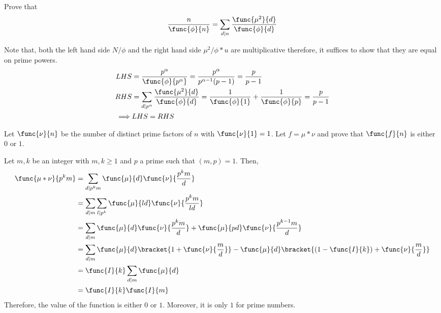 \begin{exercise}
    \item Prove that
    \begin{equation*}
        \frac{n}{\func{\phi}{n}} = \sum_{d \mid n} \dfrac{\func{\mu^2}{d}}{\func{\phi}{d}}
    \end{equation*}
    \begin{solution}
        Note that, both the left hand side \(N/\phi\) and the right hand side \(\mu^2/\phi \ast u\) are multiplicative therefore, it suffices to show that they are equal on prime powers.
        \begin{align*}
            LHS &= \dfrac{p^{\alpha}}{\func{\phi}{p^{\alpha}}} = \dfrac{p^{\alpha}}{p^{\alpha - 1}(p - 1)} = \dfrac{p}{p-1} \\
            RHS &= \sum_{d \mid p^{\alpha}} \frac{\func{\mu^2}{d}}{\func{\phi}{d}} = \dfrac{1}{\func{\phi}{1}} + \frac{1}{\func{\phi}{p}} = \dfrac{p}{p-1} \\
            \implies& LHS = RHS 
        \end{align*}
    \end{solution}
    \item Let \(\func{\nu}{n}\) be the number of distinct prime factors of \(n\) with \(\func{\nu}{1} = 1\). Let \(f = \mu \ast \nu\) and prove that \(\func{f}{n}\) is either \(0\) or \(1\).
    \begin{solution}
        Let \(m,k\) be an integer with \(m,k\geq 1\) and \(p\) a prime such that \((m,p) = 1\). Then, 
        \begin{align*}
            \func{\mu \ast \nu}{p^k m} &= \sum_{d \mid p^k m} \func{\mu}{d} \func{\nu}{\dfrac{p^km}{d}}\\
            &= \sum_{d \mid m}\sum_{l \mid p^k} \func{\mu}{l d} \func{\nu}{\dfrac{p^km}{ld}}\\
            &=  \sum_{d \mid m}\func{\mu}{d} \func{\nu}{\dfrac{p^km}{d}} + \func{\mu}{pd} \func{\nu}{\dfrac{p^{k-1}m}{d}}\\
            &= \sum_{d \mid m}\func{\mu}{d} \bracket{1 + \func{\nu}{\dfrac{m}{d}}} - \func{\mu}{d} \bracket{(1 - \func{I}{k}) + \func{\nu}{\dfrac{m}{d}}}\\
            &= \func{I}{k}\sum_{d \mid m}  \func{\mu}{d}\\
            &= \func{I}{k} \func{I}{m}
        \end{align*}
        Therefore, the value of the function is either \(0\) or \(1\). Moreover, it is only \(1\) for prime numbers.
    \end{solution}

\end{exercise}
